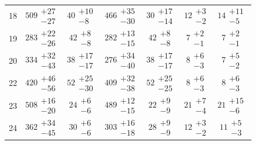 \begin{table}[htbp!]
\begin{center}
\begin{tabular}{ccccccc}
18 & $ 509 \substack{+ 27 \\ -27 }$ &$ 40 \substack{+ 10 \\- 8 }$ &$ 466 \substack{+ 35 \\- 30 }$ &$ 30 \substack{+ 17 \\- 14 }$ &$ 12 \substack{+ 3 \\- 2 }$ &$ 14 \substack{+ 11 \\- 5 }$ \\
19 & $ 283 \substack{+ 22 \\ -26 }$ &$ 42 \substack{+ 8 \\- 8 }$ &$ 282 \substack{+ 13 \\- 15 }$ &$ 42 \substack{+ 8 \\- 8 }$ &$ 7 \substack{+ 2 \\- 1 }$ &$ 7 \substack{+ 2 \\- 1 }$ \\
20 & $ 334 \substack{+ 32 \\ -43 }$ &$ 38 \substack{+ 17 \\- 17 }$ &$ 276 \substack{+ 34 \\- 40 }$ &$ 38 \substack{+ 17 \\- 17 }$ &$ 8 \substack{+ 6 \\- 3 }$ &$ 7 \substack{+ 5 \\- 2 }$ \\
22 & $ 420 \substack{+ 46 \\ -56 }$ &$ 52 \substack{+ 25 \\- 30 }$ &$ 409 \substack{+ 32 \\- 38 }$ &$ 52 \substack{+ 25 \\- 25 }$ &$ 8 \substack{+ 6 \\- 3 }$ &$ 8 \substack{+ 6 \\- 3 }$ \\
23 & $ 508 \substack{+ 16 \\ -20 }$ &$ 24 \substack{+ 6 \\- 6 }$ &$ 489 \substack{+ 12 \\- 15 }$ &$ 22 \substack{+ 9 \\- 9 }$ &$ 21 \substack{+ 7 \\- 4 }$ &$ 21 \substack{+ 15 \\- 6 }$ \\
24 & $ 362 \substack{+ 34 \\ -45 }$ &$ 30 \substack{+ 6 \\- 6 }$ &$ 303 \substack{+ 16 \\- 18 }$ &$ 28 \substack{+ 9 \\- 9 }$ &$ 12 \substack{+ 3 \\- 2 }$ &$ 11 \substack{+ 5 \\- 3 }$ \\

\end{tabular}
\end{center}
\end{table}
